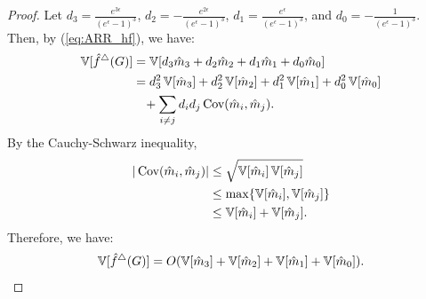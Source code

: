 \begin{proof}
Let $d_3 = \frac{e^{3\epsilon}}{(e^\epsilon-1)^3}$, $d_2 = - \frac{e^{2\epsilon}}{(e^\epsilon-1)^3}$,
$d_1 = \frac{e^{\epsilon}}{(e^\epsilon-1)^3}$, and
$d_0 = - \frac{1}{(e^\epsilon-1)^3}$.
Then, by (\ref{eq:ARR_hf}), we have:
\begin{align}
    \operatorname{\mathbb{V}}[\hat{f}^\triangle(G)]
    &= \operatorname{\mathbb{V}}[d_3 \hat{m}_3 + d_2 \hat{m}_2 + d_1 \hat{m}_1 + d_0 \hat{m}_0] \nonumber\\
    &= d_3^2 \operatorname{\mathbb{V}}[\hat{m}_3] + d_2^2 \operatorname{\mathbb{V}}[\hat{m}_2] + d_1^2 \operatorname{\mathbb{V}}[\hat{m}_1] + d_0^2 \operatorname{\mathbb{V}}[\hat{m}_0] \nonumber\\
    & \hspace{3mm} + \sum_{i \ne j} d_i d_j \operatorname{\text{Cov}}(\hat{m}_i, \hat{m}_j).
    \label{eq:V_hf_cov}
\end{align}
By the Cauchy-Schwarz inequality,
\begin{align}
|\operatorname{\text{Cov}}(\hat{m}_i, \hat{m}_j)|
&\leq \sqrt{\operatorname{\mathbb{V}}[\hat{m}_i]\operatorname{\mathbb{V}}[\hat{m}_j]} \nonumber\\
&\leq \max\{\operatorname{\mathbb{V}}[\hat{m}_i], \operatorname{\mathbb{V}}[\hat{m}_j]\} \nonumber\\
&\leq \operatorname{\mathbb{V}}[\hat{m}_i] + \operatorname{\mathbb{V}}[\hat{m}_j].
\label{eq:cov_hm_ij}
\end{align}
Therefore, we have:
\begin{align}
    \operatorname{\mathbb{V}}[\hat{f}^\triangle(G)]
    = O(\operatorname{\mathbb{V}}[\hat{m}_3] + \operatorname{\mathbb{V}}[\hat{m}_2] + \operatorname{\mathbb{V}}[\hat{m}_1] + \operatorname{\mathbb{V}}[\hat{m}_0]).
    \label{eq:V_hf_m3210}
\end{align}


\end{proof}

